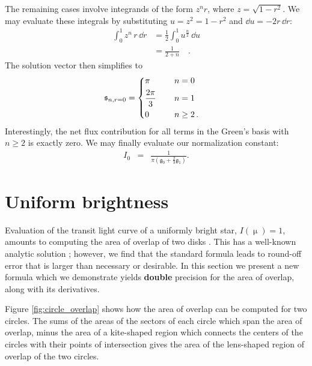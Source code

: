 \documentclass[modern,trackchanges]{aastex63}
\begin{document}
The remaining cases involve integrands of the form $z^n r$,
where $z = \sqrt{1 - r^2}$. We may evaluate
these integrals by substituting $u = z^2 = 1 - r^2$ and $\dd u = -2r \, \dd r$:
%
\begin{align}
    \label{eq:normalization5}
    \int_0^1 z^n \, r \, \dd r &= \frac{1}{2} \int_0^1 u^\frac{n}{2} \, \dd u \nonumber \\[0.5em]
                               &= \frac{1}{2 + n} \quad.
\end{align}
%
The solution vector then simplifies to
%
\begin{align}
    \label{eq:normalization6}
    \mathfrak{s}_{n,r=0} &=
    \begin{dcases}
        \pi & \qquad n = 0
        \\
        \frac{2\pi}{3} & \qquad n = 1
        \\
        0 & \qquad n \ge 2 \quad.
    \end{dcases}
\end{align}
%
Interestingly, the net flux contribution for all terms in the Green's basis with
$n \ge 2$ is exactly zero. We may finally evaluate our normalization constant:
%
\begin{eqnarray}
    \label{eq:normalization}
    I_0 &=& \frac{1}{\pi(\mathfrak{g}_0+ \tfrac{2}{3} \mathfrak{g}_1)}.
\end{eqnarray}
%




\section{Uniform brightness}

\label{sec:uniform}

Evaluation of the transit light curve of a uniformly bright star, $I(\upmu)=1$, 
amounts to computing the
area of overlap of two disks \citep{MandelAgol2002}.  This has a well-known
analytic solution \citep[e.g.][]{Weisstein2018};  however, we find that the
standard formula leads to round-off error that is larger than necessary
or desirable.  In this section we present a new formula which we demonstrate
yields {\bf double} precision for the area of overlap, along with its derivatives.

Figure \ref{fig:circle_overlap} shows how the area of overlap can be computed
for two circles.  The sums of the areas of the sectors of each circle which span
the area of overlap, minus the area of a kite-shaped region which connects the
centers of the circles with their points of intersection gives the area of the
lens-shaped region of overlap of the two circles.
\end{document}
